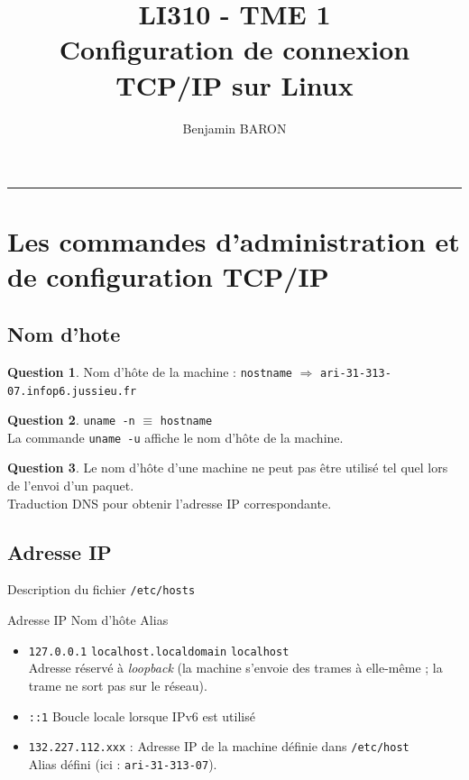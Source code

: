 \documentclass[11pt,english,french]{scrreprt}
\makeatletter
\theoremstyle{remark}
\theoremstyle{definition}
\newtheorem{ques*}{Question}[subsection]
\renewcommand{\maketitle}{\begingroup%
    \let\footnotesize\small
    \let\footnoterule\relax
    \parindent \z@
    \reset@font
    \begin{flushleft}
      \huge \sffamily \bfseries\color{orange} \@title
    \end{flushleft}
    \hrule height 1pt
    \begin{flushright}
      \large\sffamily\color{MyDarkBlue}\@author
    \end{flushright}
  \endgroup%
  \setcounter{footnote}{0}%
}
\makeatother
\begin{document}
	
\title{LI310 - TME 1\\
Configuration de connexion TCP/IP sur Linux}
\author{Benjamin BARON}

\setcounter{section}{1}

\maketitle

\section{Les commandes d'administration et de configuration TCP/IP}
\setcounter{subsection}{1}
\subsection{Nom d'hote}
\begin{ques*}
Nom d'hôte de la machine : \lstinline!nostname! $\Rightarrow$ \lstinline!ari-31-313-07.infop6.jussieu.fr!
\end{ques*}
\begin{ques*}
\lstinline!uname -n! $\equiv$ \lstinline!hostname!\\
La commande \lstinline!uname -u! affiche le nom d'hôte de la machine.
\end{ques*}

\begin{ques*}
Le nom d'hôte d'une machine ne peut pas être utilisé tel quel lors de l'envoi d'un paquet.\\
Traduction DNS pour obtenir l'adresse IP correspondante.
\end{ques*}

\subsection{Adresse IP}
Description du fichier \lstinline!/etc/hosts!

Adresse IP \qquad Nom d'hôte \qquad Alias
\begin{itemize}
	\item \lstinline!127.0.0.1! \qquad \lstinline!localhost.localdomain! \qquad \lstinline!localhost!\\
	Adresse réservé à \emph{loopback} (la machine s'envoie des trames à elle-même ; la trame ne sort pas sur le réseau).
	\item \lstinline!::1! Boucle locale lorsque IPv6 est utilisé
	\item \lstinline!132.227.112.xxx! : Adresse IP de la machine définie dans \lstinline!/etc/host!\\
	Alias défini (ici : \lstinline!ari-31-313-07!).
\end{itemize}
\end{document}
